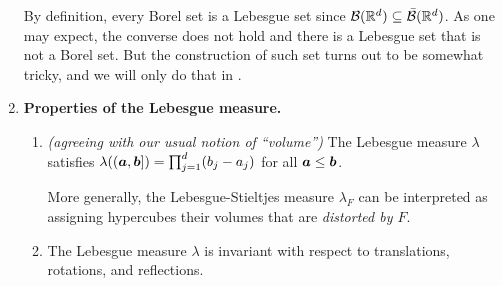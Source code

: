 \begin{enumerate}
By definition, every Borel set is a Lebesgue set since
\(\mathcal{B}(\mathbb{R}^d)\subseteq \bar{\mathcal{B}}(\mathbb{R}^d)\). As one may expect, the
converse does not hold and there is a Lebesgue set that is not a Borel set.
But the construction of such set turns out to be somewhat tricky, and we will
only do that in .

\item \label{it:lebesgue-meas-prop} \textbf{Properties of the Lebesgue measure.}
\begin{enumerate}
\item \emph{(agreeing with our usual notion of ``volume'')} The Lebesgue
measure \(\lambda\) satisfies
\(\lambda((\bm{a},\bm{b}])=\prod_{j=1}^{d}(b_j-a_j)\) for all
\(\bm{a}\le\bm{b}\).
\begin{note}
More generally, the Lebesgue-Stieltjes measure \(\lambda_{F}\) can be
interpreted as assigning hypercubes their volumes that are \emph{distorted by \(F\)}.
\end{note}

\item The Lebesgue measure \(\lambda\) is invariant with respect to
translations, rotations, and reflections.


\end{enumerate}
\end{enumerate}
